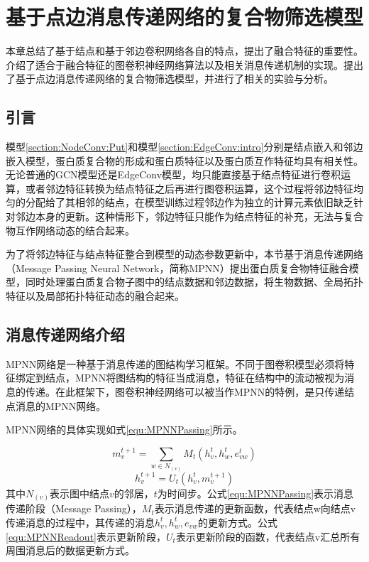 \chapter{基于点边消息传递网络的复合物筛选模型}
\label{chapter:MPNN}

本章总结了基于结点和基于邻边卷积网络各自的特点，提出了融合特征的重要性。介绍了适合于融合特征的图卷积神经网络算法以及相关消息传递机制的实现。提出了基于点边消息传递网络的复合物筛选模型，并进行了相关的实验与分析。

\section{引言}
\label{section:MPNN:Put}

模型\ref{section:NodeConv:Put}和模型\ref{section:EdgeConv:intro}分别是结点嵌入和邻边嵌入模型，蛋白质复合物的形成和蛋白质特征以及蛋白质互作特征均具有相关性。
无论普通的GCN模型还是EdgeConv模型，均只能直接基于结点特征进行卷积运算，或者邻边特征转换为结点特征之后再进行图卷积运算，这个过程将邻边特征均匀的分配给了其相邻的结点，在模型训练过程邻边作为独立的计算元素依旧缺乏针对邻边本身的更新。这种情形下，邻边特征只能作为结点特征的补充，无法与复合物互作网络动态的结合起来。

为了将邻边特征与结点特征整合到模型的动态参数更新中，本节基于消息传递网络（Message Passing Neural Network，简称MPNN）提出蛋白质复合物特征融合模型，同时处理蛋白质复合物子图中的结点数据和邻边数据，将生物数据、全局拓扑特征以及局部拓扑特征动态的融合起来。
\section{消息传递网络介绍}
\label{section:MPNN:intro}

MPNN网络\cite{gilmer_neural_2017}是一种基于消息传递的图结构学习框架。不同于图卷积模型必须将特征绑定到结点，MPNN将图结构的特征当成消息，特征在结构中的流动被视为消息的传递。在此框架下，图卷积神经网络可以被当作MPNN的特例，是只传递结点消息的MPNN网络。


MPNN网络的具体实现如式\ref{equ:MPNNPassing}所示。

\begin{equation}
    \label{equ:MPNNPassing}
    m_v^{t+1} = \sum_{w \in N_{(v)}}M_t(h_v^t,h_w^t,e_{vw}^t)
\end{equation}
\begin{equation}
    \label{equ:MPNNReadout}
    h_v^{t+1} = U_t(h_v^t,m_v^{t+1})
\end{equation}
其中$N_{(v)}$表示图中结点$v$的邻居，$t$为时间步。公式\ref{equ:MPNNPassing}表示消息传递阶段（Message Passing），$M_t$表示消息传递的更新函数，代表结点w向结点v传递消息的过程中，其传递的消息$h_v^t,h_w^t,e_{vw}$的更新方式。公式\ref{equ:MPNNReadout}表示更新阶段，$U_t$表示更新阶段的函数，代表结点v汇总所有周围消息后的数据更新方式。


